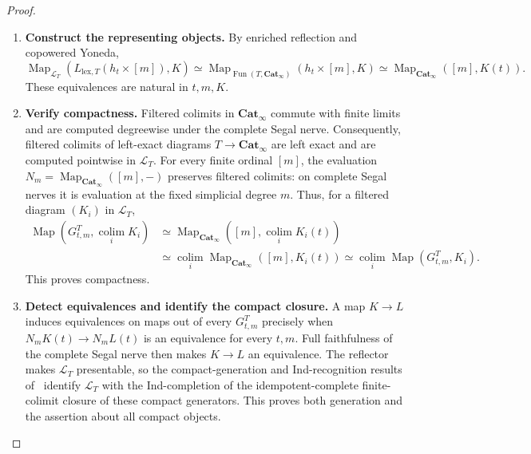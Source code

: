 \documentclass[oneside]{article}
\theoremstyle{plain}
\theoremstyle{definition}
\theoremstyle{remark}
\newcommand{\Cat}{\mathbf{Cat}_{\infty}}
\newcommand{\Fun}{\operatorname{Fun}}
\newcommand{\Map}{\operatorname{Map}}
\newcommand{\colim}{\operatorname*{colim}}
\begin{document}
\begin{proof}
\leavevmode
\begin{enumerate}
\item \textbf{Construct the representing objects.}
By enriched reflection and copowered Yoneda,
\[
 \Map_{\mathcal L_T}(L_{\mathrm{lex},T}(h_t\times[m]),K)
 \simeq\Map_{\Fun(T,\Cat)}(h_t\times[m],K)
 \simeq\Map_{\Cat}([m],K(t)).
\]
These equivalences are natural in $t,m,K$.
\item \textbf{Verify compactness.}
Filtered colimits in $\Cat$ commute with finite limits and are
computed degreewise under the complete Segal nerve.  Consequently,
filtered colimits of left-exact diagrams $T\to\Cat$ are left exact
and are computed pointwise in $\mathcal L_T$.  For every finite
ordinal $[m]$, the evaluation $N_m=\Map_{\Cat}([m],-)$ preserves
filtered colimits: on complete Segal nerves it is evaluation at the
fixed simplicial degree $m$.  Thus, for a filtered diagram
$(K_i)$ in $\mathcal L_T$,
\begin{align*}
 \Map(G^T_{t,m},\colim_iK_i)
 &\simeq\Map_{\Cat}([m],\colim_iK_i(t))\\
 &\simeq\colim_i\Map_{\Cat}([m],K_i(t))
 \simeq\colim_i\Map(G^T_{t,m},K_i).
\end{align*}
This proves compactness.
\item \textbf{Detect equivalences and identify the compact closure.}
A map $K\to L$ induces equivalences on maps out of every
$G^T_{t,m}$ precisely when $N_mK(t)\to N_mL(t)$ is an equivalence
for every $t,m$.  Full faithfulness of the complete Segal nerve then
makes $K\to L$ an equivalence.  The reflector makes $\mathcal L_T$
presentable, so the compact-generation and Ind-recognition results
of~\cite[\S5.3.5]{Lurie2009} identify $\mathcal L_T$ with the
Ind-completion of the idempotent-complete finite-colimit closure of
these compact generators.  This proves both generation and the
assertion about all compact objects.\qedhere
\end{enumerate}
\end{proof}
\end{document}
